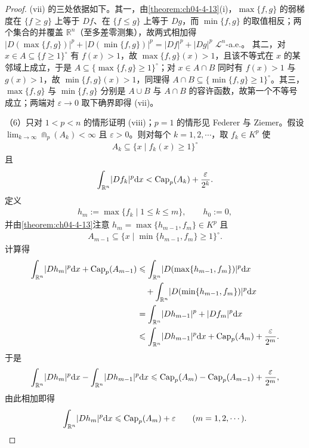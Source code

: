\documentclass[../../main.tex]{subfiles}%
\begin{document}
\begin{proof}
(vii) 的三处依据如下。其一，由\cref{theorem:ch04-4-13}(i)，$\max\{f,g\}$ 的弱梯度在 $\{f\geqslant g\}$ 上等于 $Df$、在 $\{f\leqslant g\}$ 上等于 $Dg$，而 $\min\{f,g\}$ 的取值相反；两个集合的并覆盖 $\mathbb{R}^n$（至多差零测集），故两式相加得 $\lvert D(\max\{f,g\})\rvert^p+\lvert D(\min\{f,g\})\rvert^p=\lvert Df\rvert^p+\lvert Dg\rvert^p$ $\mathcal{L}^n$-a.e.。%
其二，对 $x\in A\subseteq\{f\geqslant1\}^{\circ}$ 有 $f(x)>1$，故 $\max\{f,g\}(x)>1$，且该不等式在 $x$ 的某邻域上成立，于是 $A\subseteq\{\max\{f,g\}\geqslant1\}^{\circ}$；对 $x\in A\cap B$ 同时有 $f(x)>1$ 与 $g(x)>1$，故 $\min\{f,g\}(x)>1$，同理得 $A\cap B\subseteq\{\min\{f,g\}\geqslant1\}^{\circ}$。其三，$\max\{f,g\}$ 与 $\min\{f,g\}$ 分别是 $A\cup B$ 与 $A\cap B$ 的容许函数，故第一个不等号成立；两端对 $\varepsilon\to0$ 取下确界即得 (vii)。

（6）只对 $1<p<n$ 的情形证明 (viii)；$p=1$ 的情形见 Federer 与 Ziemer\cite{federer1972}。假设 $\lim_{k\to\infty}\Cap_p(A_k)<\infty$ 且 $\varepsilon>0$。则对每个 $k=1,2,\cdots$，取 $f_k\in K^p$ 使
\begin{align*}
A_k\subseteq\{x\mid f_k(x)\geqslant1\}^{\circ}
\end{align*}
且
\begin{align*}
\int_{\mathbb{R}^n}\lvert Df_k\rvert^p\mathrm{d} x<\operatorname{Cap}_p(A_k)+\frac{\varepsilon}{2^k}.
\end{align*}
定义
\begin{align*}
h_m:=\max\{f_k\mid1\leqslant k\leqslant m\},\qquad h_0:=0 ,
\end{align*}
并由\cref{theorem:ch04-4-13}注意 $h_m=\max\{h_{m-1},f_m\}\in K^p$ 且%
\begin{align*}
A_{m-1}\subseteq\{x\mid\min\{h_{m-1},f_m\}\geqslant1\}^{\circ}.
\end{align*}
计算得
\begin{align*}
\int_{\mathbb{R}^n}\lvert Dh_m\rvert^p\mathrm{d} x+\operatorname{Cap}_p(A_{m-1})
&\leqslant\int_{\mathbb{R}^n}\lvert D(\max\{h_{m-1},f_m\})\rvert^p\mathrm{d} x\\
&\quad+\int_{\mathbb{R}^n}\lvert D(\min\{h_{m-1},f_m\})\rvert^p\mathrm{d} x\\
&=\int_{\mathbb{R}^n}\lvert Dh_{m-1}\rvert^p+\lvert Df_m\rvert^p\mathrm{d} x\\
&\leqslant\int_{\mathbb{R}^n}\lvert Dh_{m-1}\rvert^p\mathrm{d} x+\operatorname{Cap}_p(A_m)+\frac{\varepsilon}{2^m}.
\end{align*}
于是
\begin{align*}
\int_{\mathbb{R}^n}\lvert Dh_m\rvert^p\mathrm{d} x-\int_{\mathbb{R}^n}\lvert Dh_{m-1}\rvert^p\mathrm{d} x\leqslant\operatorname{Cap}_p(A_m)-\operatorname{Cap}_p(A_{m-1})+\frac{\varepsilon}{2^m},
\end{align*}
由此相加即得
\begin{align*}
\int_{\mathbb{R}^n}\lvert Dh_m\rvert^p\mathrm{d} x\leqslant\operatorname{Cap}_p(A_m)+\varepsilon\qquad(m=1,2,\cdots).
\end{align*}


\end{proof}
\end{document}
